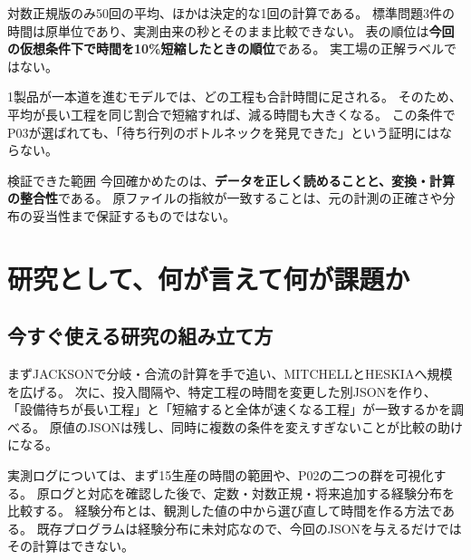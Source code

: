 \documentclass[a4paper,11pt]{ltjsarticle}
\begin{document}
対数正規版のみ50回の平均、ほかは決定的な1回の計算である。
標準問題3件の時間は原単位であり、実測由来の秒とそのまま比較できない。
表の順位は\textbf{今回の仮想条件下で時間を10\%短縮したときの順位}である。
実工場の正解ラベルではない。

1製品が一本道を進むモデルでは、どの工程も合計時間に足される。
そのため、平均が長い工程を同じ割合で短縮すれば、減る時間も大きくなる。
この条件でP03が選ばれても、「待ち行列のボトルネックを発見できた」という証明にはならない。

\begin{pointbox}{検証できた範囲}
今回確かめたのは、\textbf{データを正しく読めることと、変換・計算の整合性}である。
原ファイルの指紋が一致することは、元の計測の正確さや分布の妥当性まで保証するものではない。
\end{pointbox}

\clearpage
\section{研究として、何が言えて何が課題か}
\subsection{今すぐ使える研究の組み立て方}
まずJACKSONで分岐・合流の計算を手で追い、MITCHELLとHESKIAへ規模を広げる。
次に、投入間隔や、特定工程の時間を変更した別JSONを作り、
「設備待ちが長い工程」と「短縮すると全体が速くなる工程」が一致するかを調べる。
原値のJSONは残し、同時に複数の条件を変えすぎないことが比較の助けになる。

実測ログについては、まず15生産の時間の範囲や、P02の二つの群を可視化する。
原ログと対応を確認した後で、定数・対数正規・将来追加する経験分布を比較する。
経験分布とは、観測した値の中から選び直して時間を作る方法である。
既存プログラムは経験分布に未対応なので、今回のJSONを与えるだけではその計算はできない。
\end{document}
